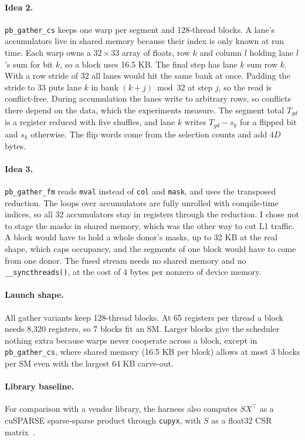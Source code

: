 \documentclass[sigconf,nonacm]{acmart}
\newcommand{\code}[1]{\texttt{#1}}
\begin{document}
\paragraph{Idea 2.} \code{pb\_gather\_cs} keeps one warp per segment and 128-thread blocks. A lane's
accumulators live in shared memory because their index is only known at run time. Each warp owns a
$32 \times 33$ array of floats, row $k$ and column $l$ holding lane $l$'s sum for bit $k$, so a block
uses 16.5 KB. The final step has lane $k$ sum row $k$. With a row stride of 32 all lanes would hit the
same bank at once. Padding the stride to 33 puts lane $k$ in bank $(k + j) \bmod 32$ at step $j$, so the
read is conflict-free. During accumulation the lanes write to arbitrary rows, so conflicts there depend
on the data, which the experiments measure. The segment total $T_{gd}$ is a register reduced with five
shuffles, and lane $k$ writes $T_{gd} - s_k$ for a flipped bit and $s_k$ otherwise. The flip words come
from the selection counts and add $4D$ bytes.

\paragraph{Idea 3.} \code{pb\_gather\_fm} reads \code{mval} instead of \code{col} and \code{mask}, and
uses the transposed reduction. The loops over accumulators are fully unrolled with compile-time
indices, so all 32 accumulators stay in registers through the reduction. I chose not to stage the
masks in shared memory, which was the other way to cut L1 traffic. A block would have to hold a whole
donor's masks, up to 32 KB at the real shape, which caps occupancy, and the segments of one block
would have to come from one donor. The fused stream needs no shared memory and no
\code{\_\_syncthreads()}, at the cost of 4 bytes per nonzero of device memory.

\paragraph{Launch shape.} All gather variants keep 128-thread blocks. At 65 registers per thread a
block needs 8,320 registers, so 7 blocks fit an SM. Larger blocks give the scheduler nothing extra
because warps never cooperate across a block, except in \code{pb\_gather\_cs}, where shared memory
(16.5 KB per block) allows at most 3 blocks per SM even with the largest 64 KB carve-out.

\paragraph{Library baseline.} For comparison with a vendor library, the harness also computes
$S X^{\top}$ as a cuSPARSE sparse-sparse product through \code{cupyx}, with $S$ as a float32 CSR
matrix~\cite{cusparse}.
\end{document}
